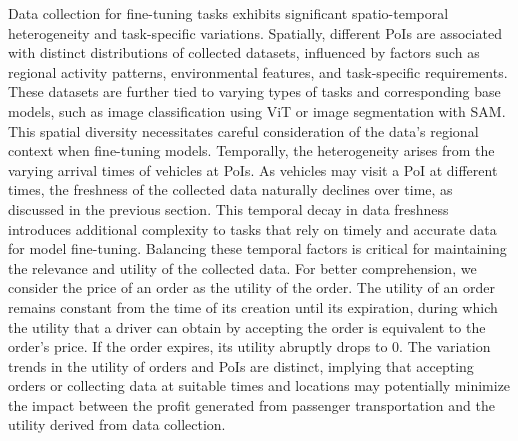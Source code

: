 \smallskip
{} 
Data collection for fine-tuning tasks exhibits significant spatio-temporal heterogeneity and task-specific variations. Spatially, different PoIs are associated with distinct distributions of collected datasets, influenced by factors such as regional activity patterns, environmental features, and task-specific requirements. These datasets are further tied to varying types of tasks and corresponding base models, such as image classification using ViT or image segmentation with SAM. This spatial diversity necessitates careful consideration of the data's regional context when fine-tuning models. Temporally, the heterogeneity arises from the varying arrival times of vehicles at PoIs. As vehicles may visit a PoI at different times, the freshness of the collected data naturally declines over time, as discussed in the previous section. This temporal decay in data freshness introduces additional complexity to tasks that rely on timely and accurate data for model fine-tuning. Balancing these temporal factors is critical for maintaining the relevance and utility of the collected data.
For better comprehension, we consider the price of an order as the utility of the order. The utility of an order remains constant from the time of its creation until its expiration, during which the utility that a driver can obtain by accepting the order is equivalent to the order's price. If the order expires, its utility abruptly drops to 0. The variation trends in the utility of orders and PoIs are distinct, implying that accepting orders or collecting data at suitable times and locations may potentially minimize the impact between the profit generated from passenger transportation and the utility derived from data collection. 



